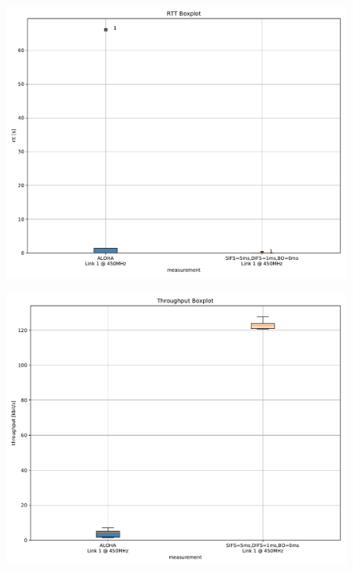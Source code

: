 \documentclass{article}
\begin{document}
\begin{figure}
	\includegraphics[width=\textwidth]{aloha_no_bo/boxplot/rtt_boxplot}
\end{figure}

\begin{figure}
	\includegraphics[width=\textwidth]{aloha_no_bo/boxplot/throughput_boxplot}
\end{figure}
\end{document}
